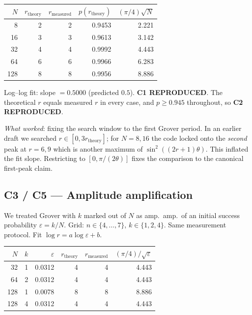 \documentclass[11pt]{article}
\begin{document}
\begin{center}
\begin{tabular}{@{}rrrrr@{}}
\toprule
$N$ & $r_{\text{theory}}$ & $r_{\text{measured}}$ & $p(r_{\text{theory}})$ & $(\pi/4)\sqrt{N}$ \\
\midrule
8   & 2 & 2 & 0.9453 & 2.221 \\
16  & 3 & 3 & 0.9613 & 3.142 \\
32  & 4 & 4 & 0.9992 & 4.443 \\
64  & 6 & 6 & 0.9966 & 6.283 \\
128 & 8 & 8 & 0.9956 & 8.886 \\
\bottomrule
\end{tabular}
\end{center}

Log--log fit: slope $= \mathbf{0.5000}$ (predicted $0.5$). \textbf{C1 REPRODUCED}. The
theoretical $r$ equals measured $r$ in every case, and $p \ge 0.945$ throughout,
so \textbf{C2 REPRODUCED}.

\emph{What worked}: fixing the search window to the first Grover period. In
an earlier draft we searched $r \in [0, 3r_\text{theory}]$; for $N=8,16$
the code locked onto the \emph{second} peak at $r=6,9$ which is another
maximum of $\sin^2((2r+1)\theta)$. This inflated the fit slope. Restricting
to $[0, \pi/(2\theta)]$ fixes the comparison to the canonical
first-peak claim.

\subsection{C3 / C5 --- Amplitude amplification}
We treated Grover with $k$ marked out of $N$ as amp.\ amp.\ of an initial
success probability $\varepsilon = k/N$. Grid: $n \in \{4,\dots,7\}$,
$k \in \{1,2,4\}$. Same measurement protocol. Fit $\log r = a\log\varepsilon + b$.

\begin{center}
\begin{tabular}{@{}rrrrrr@{}}
\toprule
$N$ & $k$ & $\varepsilon$ & $r_{\text{theory}}$ & $r_{\text{measured}}$ & $(\pi/4)/\sqrt{\varepsilon}$ \\
\midrule
32 & 1 & 0.0312 & 4 & 4 & 4.443 \\
64 & 2 & 0.0312 & 4 & 4 & 4.443 \\
128 & 1 & 0.0078 & 8 & 8 & 8.886 \\
128 & 4 & 0.0312 & 4 & 4 & 4.443 \\
\bottomrule
\end{tabular}
\end{center}
\end{document}
